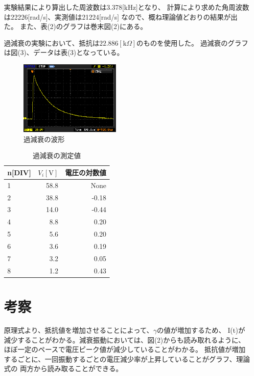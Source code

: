 \documentclass[a4j,10pt]{jarticle}
\begin{document}
実験結果により算出した周波数は3.378[kHz]となり、
計算により求めた角周波数は22226[rad/s]、実測値は21224[rad/s]
なので、概ね理論値どおりの結果が出た。
また、表(2)のグラフは巻末図(2)にある。

過減衰の実験において、抵抗は$22.886[\mathrm k \Omega]$のものを使用した。
過減衰のグラフは図(3)、データは表(3)となっている。
\begin{figure}[h]
\begin{center}
\includegraphics[width=5cm]{over.eps}
\caption{過減衰の波形}
\end{center}
\end{figure}
\begin{table}[h]
\begin{center}
\caption{過減衰の測定値}
\begin{tabular}{|l|r|r|}
\hline
n[DIV]&$V_{i}[\mathrm V]$&電圧の対数値 \\ \hline \hline
1&58.8&None \\ \hline
2&38.8&-0.18 \\ \hline
3&14.0&-0.44 \\ \hline
4&8.8&0.20 \\ \hline
5&5.6&0.20  \\ \hline
6&3.6&0.19  \\ \hline
7&3.2&0.05  \\ \hline
8&1.2&0.43  \\ \hline
\end{tabular}
\end{center}
\end{table}
\section{考察}
原理式より、抵抗値を増加させることによって、$\gamma$の値が増加するため、
I(t)が減少することがわかる。減衰振動においては、図(2)からも読み取れるように、
ほぼ一定のペースで電圧ピーク値が減少していることがわかる。
抵抗値が増加するごとに、一回振動するごとの電圧減少率が上昇していることがグラフ、理論式の
両方から読み取ることができる。
\end{document}

